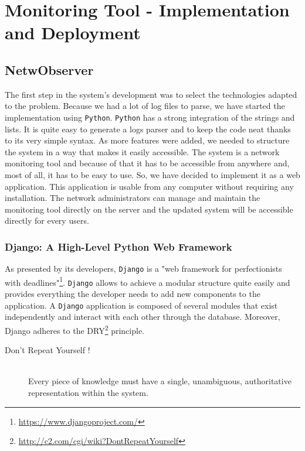 \chapter{Monitoring Tool - Implementation and Deployment} %

\label{Chapter4} %


\section{NetwObserver}
The first step in the system's development was to select the technologies adapted to the problem. Because we had a lot of log files to parse, we have started the implementation using \texttt{Python}. \texttt{Python} has a strong integration of the strings and lists. It is quite easy to generate a logs parser and to keep the code neat thanks to its very simple syntax.
As more features were added, we needed to structure the system in a way that makes it easily accessible. The system is a network monitoring tool and because of that it has to be accessible from anywhere and, most of all, it has to be easy to use. So, we have decided to implement it as a web application. This application is usable from any computer without requiring any installation. The network administrators can manage and maintain the monitoring tool directly on the server and the updated system will be accessible directly for every users.

\subsection{Django: A High-Level Python Web Framework}
As presented by its developers, \texttt{Django} is a "web framework for perfectionists with deadlines"\footnote{\url{https://www.djangoproject.com/}}. \texttt{Django} allows to achieve a modular structure quite easily and provides everything the developer needs to add new components to the application. A \texttt{Django} application is composed of several modules that exist independently and interact with each other through the database.
Moreover, Django adheres to the DRY\footnote{\url{http://c2.com/cgi/wiki?DontRepeatYourself}} principle.

\begin{description}
  \item[Don't Repeat Yourself !] \hfill \\
  Every piece of knowledge must have a single, unambiguous, authoritative representation within the system.
\end{description}

